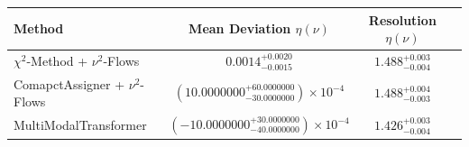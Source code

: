     \begin{tabular}{lccc}
        \toprule
        Method & Mean Deviation $\eta({\nu})$ & Resolution $\eta({\nu})$ \\
        \midrule
        $\chi^2$-Method + $\nu^2$-Flows & $0.0014^{+0.0020}_{-0.0015}$ & $1.488^{+0.003}_{-0.004}$ \\
        ComapctAssigner + $\nu^2$-Flows & $(10.0000000^{+60.0000000}_{-30.0000000})\times 10^{-4}$ & $1.488^{+0.004}_{-0.003}$ \\
        MultiModalTransformer & $(-10.0000000^{+30.0000000}_{-40.0000000})\times 10^{-4}$ & $1.426^{+0.003}_{-0.004}$ \\
        \bottomrule
    \end{tabular}